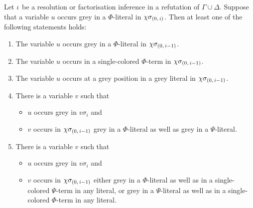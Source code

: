 \documentclass[,%
	draft=false,%
	numbers=noendperiod
	12pt,
	a4paper,
	oneside,%
	openany,
]{memoir}
\newcommand{\inv}{\ensuremath{\chi}}
\begin{document}
\begin{lemma}
	\label{lemma:var_grey_col_lit}
	Let $\iota$ be a resolution or factorisation inference in a refutation of $\Gamma\cup\Delta$.
	Suppose that a variable $u$ occurs grey in a $\Phi$-literal in $\inv\sigmazi$.
	Then at least one of the following statements holds:
	\begin{enumerate}
		\item
			\label{14_1}
			The variable $u$ occurs grey in a $\Phi$-literal in $\inv\sigmazmi$.

		\item
			\label{14_5}
			The variable $u$ occurs in a single-colored $\Phi$-term in $\inv\sigmazmi$.

		\item
			\label{14_4}
			The variable $u$ occurs at a grey position in a grey literal in $\inv\sigmazmi$.

		\item 
			\label{14_2}
			There is a variable $v$ such that 
			{
				\renewcommand{\labelitemi}{\textendash}
				\begin{itemize}
					\item $u$ occurs grey in $v\sigma_i$ and
					\item $v$ occurs in $\inv\sigmazmi$ grey in a $\Phi$-literal as well as grey in a $\Psi$-literal.
				\end{itemize}
			}

		\item 
			\label{14_3}
			There is a variable $v$ such that
			{
				\renewcommand{\labelitemi}{\textendash}
				\begin{itemize}
					\item $u$ occurs grey in $v\sigma_i$ and
					\item
						$v$ occurs in $\inv\sigmazmi$
						either grey in a $\Phi$-literal as well as in a single-colored $\Psi$-term in any literal, 
						or grey in a $\Psi$-literal as well as in a single-colored $\Phi$-term in any literal.
				\end{itemize}
			}

	\end{enumerate}
\end{lemma}
\end{document}
